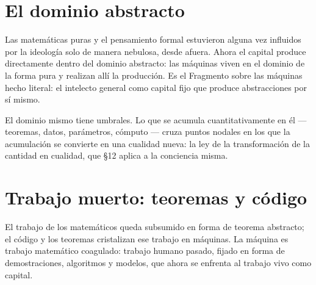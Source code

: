 \documentclass[11pt]{article}
\begin{document}
\section{El dominio abstracto}

Las matemáticas puras y el pensamiento formal estuvieron alguna vez
influidos por la ideología solo de manera nebulosa, desde afuera. Ahora
el capital produce directamente dentro del dominio abstracto: las
máquinas viven en el dominio de la forma pura y realizan allí la
producción. Es el Fragmento sobre las máquinas hecho literal: el
intelecto general como capital fijo que produce abstracciones por sí
mismo.

El dominio mismo tiene umbrales. Lo que se acumula cuantitativamente
en él --- teoremas, datos, parámetros, cómputo --- cruza puntos nodales
en los que la acumulación se convierte en una cualidad nueva: la ley de
la transformación de la cantidad en cualidad, que §12 aplica a la
conciencia misma.

\section{Trabajo muerto: teoremas y código}

El trabajo de los matemáticos queda subsumido en forma de teorema
abstracto; el código y los teoremas cristalizan ese trabajo en máquinas.
La máquina es trabajo matemático coagulado: trabajo humano pasado,
fijado en forma de demostraciones, algoritmos y modelos, que ahora se
enfrenta al trabajo vivo como capital.
\end{document}
